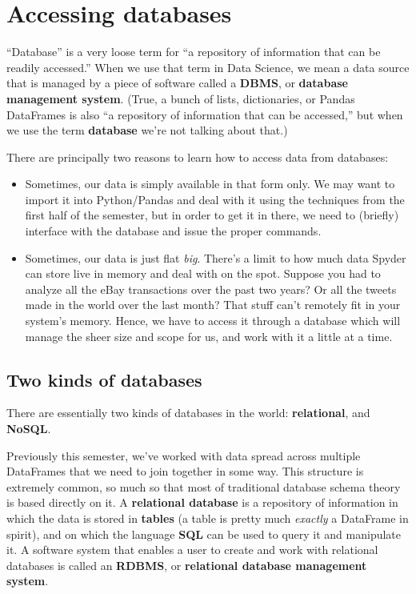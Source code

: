 
\chapter{Accessing databases}

``Database'' is a very loose term for ``a repository of information that can
be readily accessed.'' When we use that term in Data Science, we mean a data
source that is managed by a piece of software called a \textbf{DBMS}, or
\textbf{database management system}. (True, a bunch of lists, dictionaries, or
Pandas DataFrames is also ``a repository of information that can be
accessed,'' but when we use the term \textbf{database} we're not talking about
that.)

There are principally two reasons to learn how to access data from databases:

\begin{itemize}
\itemsep.1em
\item Sometimes, our data is simply available in that form only. We may want
to import it into Python/Pandas and deal with it using the techniques from the
first half of the semester, but in order to get it in there, we need to
(briefly) interface with the database and issue the proper commands.
\item Sometimes, our data is just flat \textit{big}. There's a limit to how
much data Spyder can store live in memory and deal with on the spot. Suppose
you had to analyze all the eBay transactions over the past two years? Or all
the tweets made in the world over the last month? That stuff can't remotely
fit in your system's memory. Hence, we have to access it through a database
which will manage the sheer size and scope for us, and work with it a little
at a time.
\end{itemize}

\section{Two kinds of databases}

There are essentially two kinds of databases in the world:
\textbf{relational}, and \textbf{NoSQL}.

Previously this semester, we've worked with data spread across multiple
DataFrames that we need to join together in some way. This structure is
extremely common, so much so that most of traditional database schema theory
is based directly on it. A \textbf{relational database} is a repository of
information in which the data is stored in \textbf{tables} (a table is pretty
much \textit{exactly} a DataFrame in spirit), and on which the language
\textbf{SQL} can be used to query it and manipulate it. A software system that
enables a user to create and work with relational databases is called an
\textbf{RDBMS}, or \textbf{relational database management system}.

